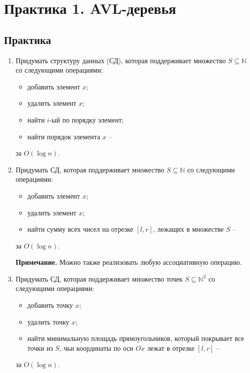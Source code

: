\section{Практика 1. AVL-деревья}

\subsection{Практика}

\begin{enumerate}
  \item Придумать структуру данных (СД), которая поддерживает множество $S
\subseteq \mathbb{N}$ со следующими операциями:
    \begin{itemize}
      \item добавить элемент $x$;
      \item удалить элемент $x$;
      \item найти $i$-ый по порядку элемент;
      \item найти порядок элемента $x$ --
    \end{itemize}  
    за $O(\log n)$.

  \item Придумать СД, которая поддерживает множество $S \subseteq \mathbb{N}$ со
следующими операциями: 
    \begin{itemize}
      \item добавить элемент $x$;
      \item удалить элемент $x$;
      \item найти сумму всех чисел на отрезке $[l, r]$, лежащих в множестве $S$ --
    \end{itemize}  
    за $O(\log n)$.
    
   \textbf{Примечание.} Можно также реализовать любую ассоциативную операцию.    


  \item Придумать СД, которая поддерживает множество точек $S \subseteq
\mathbb{N}^2$ со следующими операциями: 
    \begin{itemize}
      \item добавить точку $x$;
      \item удалить точку $x$;
      \item найти минимальную площадь прямоугольников, который покрывает все
точки из $S$, чьи координаты по оси $Ox$ лежат в отрезке $[l, r]$ --
\end{itemize}
    за $O(\log n)$.

\end{enumerate}

